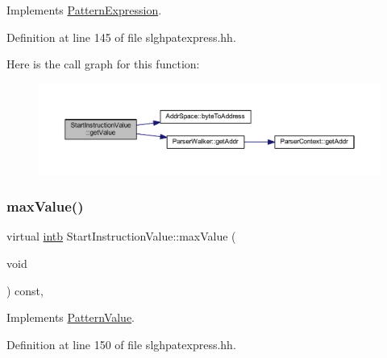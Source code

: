 Implements \mbox{\hyperlink{class_pattern_expression_a8332c6ea4c5a7e9dfc690df2a6458bb8}{Pattern\+Expression}}.



Definition at line 145 of file slghpatexpress.\+hh.

Here is the call graph for this function\+:
\nopagebreak
\begin{figure}[H]
\begin{center}
\leavevmode
\includegraphics[width=350pt]{class_start_instruction_value_a3f4a8c25d278300066291616f10c355b_cgraph}
\end{center}
\end{figure}
\mbox{\label{class_start_instruction_value_a87c142a7b212a8b68e7ca1f9ad3f9ede}} 
\subsubsection{\texorpdfstring{maxValue()}{maxValue()}}
{\footnotesize\ttfamily virtual \mbox{\hyperlink{types_8h_aa925ba3e627c2df89d5b1cfe84fb8572}{intb}} Start\+Instruction\+Value\+::max\+Value (\begin{DoxyParamCaption}\item[{void}]{ }\end{DoxyParamCaption}) const\hspace{0.3cm}{\ttfamily [inline]}, {\ttfamily [virtual]}}



Implements \mbox{\hyperlink{class_pattern_value_a865e8f34e031ef31f77dcaa93d76820d}{Pattern\+Value}}.



Definition at line 150 of file slghpatexpress.\+hh.

\mbox{\label{class_start_instruction_value_a3bb03f2948fdb225bbd97607915829bd}} 
